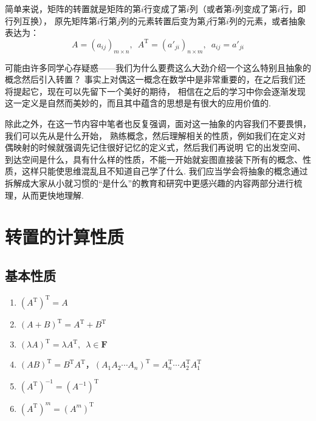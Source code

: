 简单来说，矩阵的转置就是矩阵的第$i$行变成了第$i$列（或者第$i$列变成了第$i$行，即行列互换），
原先矩阵第$i$行第$j$列的元素转置后变为第$j$行第$i$列的元素，或者抽象表达为：
\[A=(a_{ij})_{m \times n},\enspace A^\mathrm{T}=(a'_{ji})_{n \times m},\enspace a_{ij}=a'_{ji}\]


可能由许多同学心存疑惑——我们为什么要费这么大劲介绍一个这么特别且抽象的概念然后引入转置？
事实上对偶这一概念在数学中是非常重要的，在之后我们还将提起它，现在可以先留下一个美好的期待，
相信在之后的学习中你会逐渐发现这一定义是自然而美妙的，而且其中蕴含的思想是有很大的应用价值的.

除此之外，在这一节内容中笔者也反复强调，面对这一抽象的内容我们不要畏惧，我们可以先从是什么开始，
熟练概念，然后理解相关的性质，例如我们在定义对偶映射的时候就强调先记住很好记忆的定义式，然后我们再说明
它的出发空间、到达空间是什么，具有什么样的性质，不能一开始就妄图直接装下所有的概念、性质，这样只能使思维混乱且不知道自己学了什么.
我们应当学会将抽象的概念通过拆解成大家从小就习惯的``是什么''的教育和研究中更感兴趣的内容两部分进行梳理，从而更快地理解.

\section{转置的计算性质}
\subsection{基本性质}
\begin{enumerate}
    \item $(A^\mathrm{T})^\mathrm{T}=A$

    \item $(A+B)^\mathrm{T}=A^\mathrm{T}+B^\mathrm{T}$

    \item $(\lambda A)^\mathrm{T}=\lambda A^\mathrm{T},\enspace \lambda \in \mathbf{F}$

    \item $(AB)^\mathrm{T}=B^\mathrm{T}A^\mathrm{T}$，$(A_1A_2\cdots A_n)^\mathrm{T}=A_n^\mathrm{T}\cdots A_2^\mathrm{T}A_1^\mathrm{T}$

    \item $(A^\mathrm{T})^{-1}=(A^{-1})^\mathrm{T}$

    \item $(A^\mathrm{T})^m=(A^m)^\mathrm{T}$
\end{enumerate}

